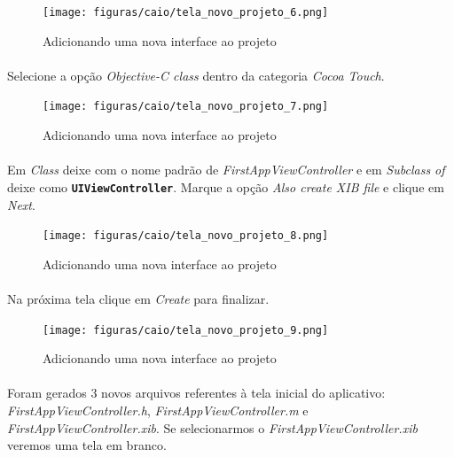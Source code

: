 \documentclass[a4paper,12pt,brazil,doubleside]{book}
\begin{document}
\begin{singlespace}
\begin{figure}[H]
  \centering
  \texttt{[image: figuras/caio/tela\_novo\_projeto\_6.png]}
  \caption{Adicionando uma nova interface ao projeto}
  \label{fig:a}
\end{figure}

\paragraph{}Selecione a opção \emph{Objective-C class} dentro da categoria \emph{Cocoa Touch}.

\begin{figure}[H]
  \centering
  \texttt{[image: figuras/caio/tela\_novo\_projeto\_7.png]}
  \caption{Adicionando uma nova interface ao projeto}
  \label{fig:a}
\end{figure}

\paragraph{}Em \emph{Class} deixe com o nome padrão de \emph{FirstAppViewController} e em \emph{Subclass of} deixe como \texttt{\textbf{UIViewController}}. Marque a opção \emph{Also create XIB file} e clique em \emph{Next}.

\begin{figure}[H]
  \centering
  \texttt{[image: figuras/caio/tela\_novo\_projeto\_8.png]}
  \caption{Adicionando uma nova interface ao projeto}
  \label{fig:a}
\end{figure}

\paragraph{}Na próxima tela clique em \emph{Create} para finalizar.

\begin{figure}[H]
  \centering
  \texttt{[image: figuras/caio/tela\_novo\_projeto\_9.png]}
  \caption{Adicionando uma nova interface ao projeto}
  \label{fig:a}
\end{figure}

\paragraph{}Foram gerados 3 novos arquivos referentes à tela inicial do aplicativo: \emph{FirstAppViewController.h}, \emph{FirstAppViewController.m} e \emph{FirstAppViewController.xib}. Se selecionarmos o \emph{FirstAppViewController.xib} veremos uma tela em branco.


\end{singlespace}
\end{document}
